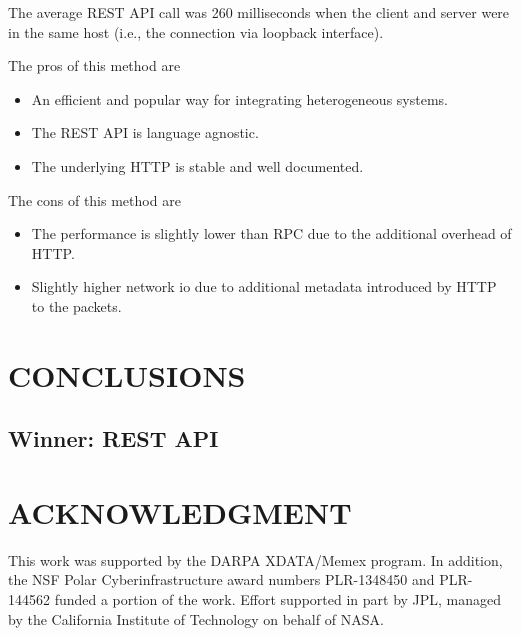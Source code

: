 \documentclass[letterpaper, 10 pt, conference]{ieeeconf}  %
\begin{document}
The average REST API call was 260 milliseconds when the client and server were in the same host (i.e., the connection via loopback interface).

The pros of this method are 
\begin{itemize}
\item An efficient and popular way for integrating heterogeneous systems.
\item The REST API is language agnostic.
\item The underlying HTTP is stable and well documented.
\end{itemize}

The cons of this method are 
\begin{itemize}
\item The performance is slightly lower than RPC due to the additional overhead of HTTP.
\item Slightly higher network io due to additional metadata introduced by HTTP to the packets.
\end{itemize}

\section{CONCLUSIONS}
\subsection{Winner: REST API}

\section*{ACKNOWLEDGMENT}
This work was supported by the DARPA XDATA/Memex program. In addition, the NSF Polar Cyberinfrastructure award numbers PLR-1348450 and PLR-144562 funded a portion of the work. Effort supported in part by JPL, managed by the California Institute of Technology on behalf of NASA.


\end{document}
